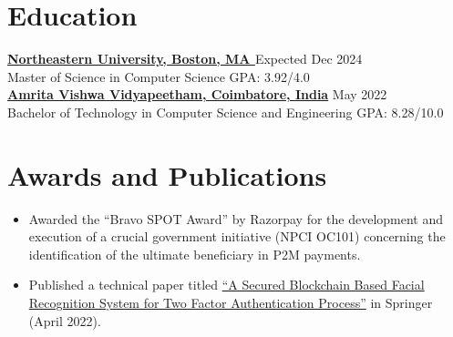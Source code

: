 \section*{Education}
\textbf{\href{https://www.northeastern.edu/}{Northeastern University, Boston, MA }} \hfill Expected Dec 2024 \\
Master of Science in Computer Science \hfill GPA: 3.92/4.0 \\

\textbf{\href{https://www.amrita.edu/}{Amrita Vishwa Vidyapeetham, Coimbatore, India}} \hfill May 2022 \\
Bachelor of Technology in Computer Science and Engineering \hfill GPA: 8.28/10.0 \\

\section*{Awards and Publications}
\begin{itemize}
  \item Awarded the ``Bravo SPOT Award'' by Razorpay for the development and execution of a crucial government initiative (NPCI OC101) concerning the identification of the ultimate beneficiary in P2M payments.
  \item Published a technical paper titled \href{https://link.springer.com/chapter/10.1007/978-981-19-1677-9_44} {``A Secured Blockchain Based Facial Recognition System for Two Factor Authentication Process''} in Springer (April 2022).  
\end{itemize}


